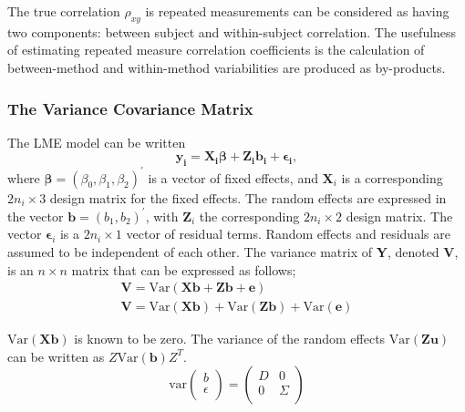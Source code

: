 \documentclass[12pt, a4paper]{report}
\theoremstyle{plain}
\theoremstyle{definition}
\theoremstyle{remark}
\begin{document}
			The true correlation $\rho_{xy}$ is repeated measurements can be considered as having two components: between subject and within-subject correlation. The usefulness of estimating repeated measure correlation coefficients is the calculation of between-method and within-method variabilities are produced as by-products.
			
			\subsubsection{The Variance Covariance Matrix}
			The LME model can be written
			\[
			\boldsymbol{y_{i}} = \boldsymbol{X_{i}\beta} + \boldsymbol{Z_{i}b_{i}} + \boldsymbol{\epsilon_{i}},
			\]
			where $\boldsymbol{\beta}=(\beta_0,\beta_1,\beta_2)^\prime$ is a vector of fixed effects, and $\boldsymbol{X}_i$ is a corresponding $2n_i\times 3$ design matrix for the fixed effects. The random effects are expressed in the vector $\boldsymbol{b}=(b_1,b_2)^\prime$, with $\boldsymbol{Z}_i$ the corresponding $2n_i\times 2$ design matrix. The vector $\boldsymbol{\epsilon}_i$ is a $2n_i\times 1$ vector of residual terms. Random effects and residuals are assumed to be independent of each other.
			The variance matrix of \textbf{Y}, denoted \textbf{V}, is an $n \times n$ matrix that can be expressed
			as follows;
			\begin{eqnarray}
			\textbf{V}= \textrm{Var} ( \textbf{Xb} + \textbf{Zb} + \textbf{e})\\
			\textbf{V}= \textrm{Var} ( \textbf{Xb} ) + \textrm{Var} (\textbf{Zb}) +
			\textrm{Var}(\textbf{e})
			\end{eqnarray}
			
			
			$\mbox{Var}(\textbf{Xb})$ is known to be zero. The variance of the
			random effects $\mbox{Var}(\textbf{Zu})$ can be written as
			$Z\mbox{Var}(\textbf{b})Z^{T}$.
			\[
			\mathrm{var}
			\left(
			\begin{array}{c}
			b \\
			\epsilon \\
			\end{array}
			\right)
			=
			\left(
			\begin{array}{cc}
			D & 0 \\
			0 & \Sigma \\
			\end{array}
			\right)
			\]
			
			
			
\end{document}
